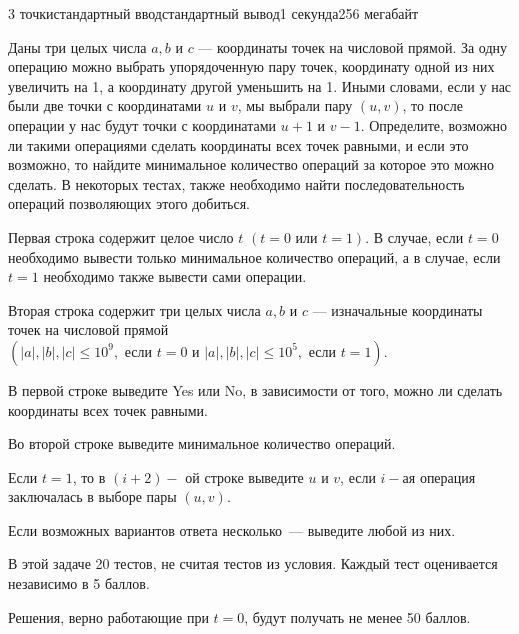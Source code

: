 \begin{problem}{3 точки}{стандартный ввод}{стандартный вывод}{1 секунда}{256 мегабайт}

Даны три целых числа $a, b $ и $c$ --- координаты точек на числовой прямой. За одну операцию можно выбрать упорядоченную пару точек, координату одной из них увеличить на 1, а координату другой уменьшить на 1. Иными словами, если у нас были две точки с координатами $u$ и $v$, мы выбрали пару $(u, v)$, то после операции у нас будут точки с координатами $u+1$ и $v-1$. Определите, возможно ли такими операциями сделать координаты всех точек равными, и если это возможно, то найдите минимальное количество операций за которое это можно сделать. В некоторых тестах, также необходимо найти последовательность операций позволяющих этого добиться.

\InputFile
Первая строка содержит целое число $t$ $( t = 0 \text{ или } t = 1)$. В случае, если $t = 0$ необходимо вывести только минимальное количество операций, а в случае, если $t = 1$ необходимо также вывести сами операции.

Вторая строка содержит три целых числа $a,b$ и $c$ --- изначальные координаты точек на числовой прямой $(|a|, |b|, |c| \leq 10^9, \text{ если } t = 0 \text{ и } |a|, |b|, |c| \leq 10^5,  \text{ если } t = 1)$. 

\OutputFile
В первой строке выведите Yes или No, в зависимости от того, можно ли сделать координаты всех точек равными.

Во второй строке выведите минимальное количество операций. 

Если $t = 1$, то в $(i+2)-$ ой строке выведите $u$ и $v$, если $i-$ая операция заключалась в выборе пары $(u,v)$.

Если возможных вариантов ответа несколько~--- выведите любой из них.

\Scoring
В этой задаче 20 тестов, не считая тестов из условия. Каждый тест оценивается независимо в 5 баллов.

Решения, верно работающие при $t = 0$, будут получать не менее 50 баллов.

\Examples

\begin{example}
%
%
%
\end{example}

\end{problem}

